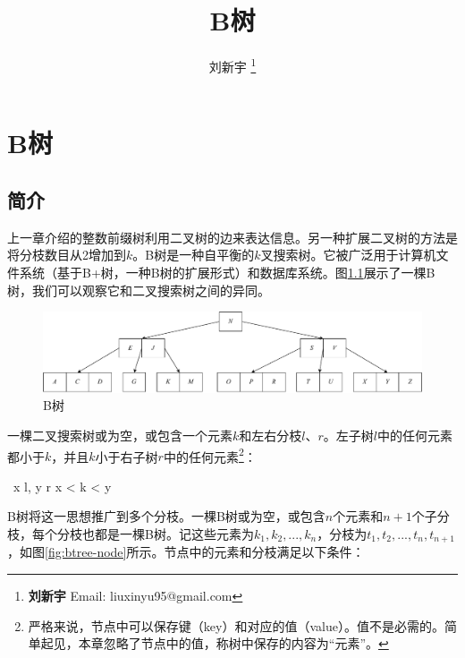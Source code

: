 \documentclass[b5paper]{ctexart}
\begin{document}
\title{B树}

\author{刘新宇
\thanks{{\bfseries 刘新宇 } \newline
  Email: liuxinyu95@gmail.com \newline}
  }

\maketitle
\fi


\ifx\wholebook\relax
\chapter{B树}
\fi

\section{简介}
\label{introduction}

上一章介绍的整数前缀树利用二叉树的边来表达信息。另一种扩展二叉树的方法是将分枝数目从2增加到$k$。B树是一种自平衡的$k$叉搜索树\cite{wiki-b-tree}。它被广泛用于计算机文件系统（基于B+树，一种B树的扩展形式）和数据库系统。图\cref{fig:btree-example}展示了一棵B树，我们可以观察它和二叉搜索树之间的异同。

\begin{figure}[htbp]
  \centering
  \includegraphics[scale=0.33]{img/btree-del-before}
  \caption{B树}
  \label{fig:btree-example}
\end{figure}

一棵二叉搜索树或为空，或包含一个元素$k$和左右分枝$l$、$r$。左子树$l$中的任何元素都小于$k$，并且$k$小于右子树$r$中的任何元素\footnote{严格来说，节点中可以保存键（key）和对应的值（value）。值不是必需的。简单起见，本章忽略了节点中的值，称树中保存的内容为“元素”。}：

\be
\forall\ x \in l, y \in r \Rightarrow x < k < y
\ee

B树将这一思想推广到多个分枝。一棵B树或为空，或包含$n$个元素和$n + 1$个子分枝，每个分枝也都是一棵B树。记这些元素为$k_1, k_2, ..., k_n$，分枝为$t_1, t_2, ..., t_n, t_{n+1}$，如图\cref{fig:btree-node}所示。节点中的元素和分枝满足以下条件：
\end{document}
